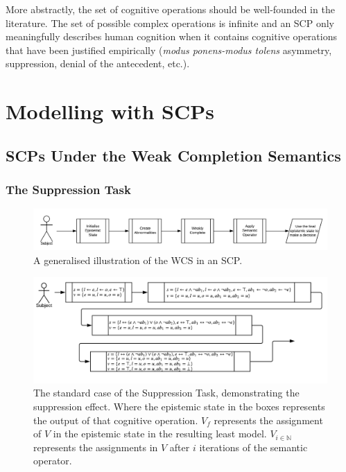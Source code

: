 \documentclass{article}
\begin{document}
More abstractly, the set of cognitive operations should be well-founded in the literature. The set of possible complex operations is infinite and an SCP only meaningfully describes human cognition when it contains cognitive operations that have been justified empirically (\textit{modus ponens-modus tolens} asymmetry, suppression, denial of the antecedent, etc.). 

\section{Modelling with SCPs} \label{sec:mod}
\subsection{SCPs Under the Weak Completion Semantics}

\subsubsection{The Suppression Task}
\begin{figure}
\begin{center}
 \centering \includegraphics[width=\linewidth]{suppressionSCP_overview}
\caption{A generalised illustration of the WCS in an SCP. }
\label {fig:supoverview}
\end{center}
\end{figure}

\begin{figure}
\begin{center}
 \centering \includegraphics[width=\linewidth]{suppressionSCP_normal}
\caption{The standard case of the Suppression Task, demonstrating the suppression effect. Where the epistemic state in the boxes represents the output of that cognitive operation. $V_f$ represents the assignment of $V$ in the epistemic state in the resulting least model. $V_{i\in \mathbb{N}}$ represents the assignments in $V$ after $i$ iterations of the semantic operator.}
\label {fig:supnormal}
\end{center}
\end{figure}
\end{document}
